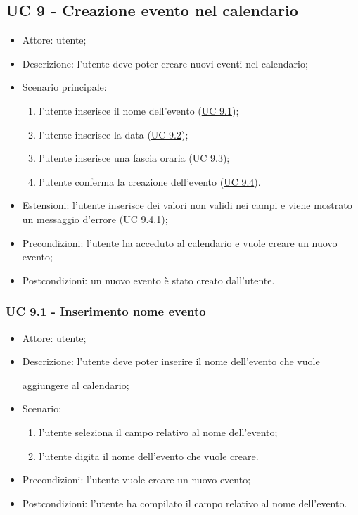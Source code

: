 

\subsection{UC 9 - Creazione evento nel calendario}
\begin{itemize}
    \item Attore: utente;
    \item Descrizione: l'utente deve poter creare nuovi eventi nel calendario;
    \item Scenario principale:
        \begin{enumerate}
        \item l'utente inserisce il nome dell'evento (\hyperref[sec: UC 9.1]{UC 9.1});
        \item l'utente inserisce la data (\hyperref[sec: UC 9.2]{UC 9.2});
        \item l'utente inserisce una fascia oraria (\hyperref[sec: UC 9.3]{UC 9.3});
        \item l'utente conferma la creazione dell'evento (\hyperref[sec: UC 9.4]{UC 9.4}).
        \end{enumerate}
    \item Estensioni: l'utente inserisce dei valori non validi nei campi e viene mostrato un messaggio d'errore (\hyperref[sec: UC 9.4.1]{UC 9.4.1});
    \item Precondizioni: l'utente ha acceduto al calendario e vuole creare un nuovo evento;
    \item Postcondizioni: un nuovo evento è stato creato dall'utente.
\end{itemize}

\subsubsection{UC 9.1 - Inserimento nome evento} \label{sec: UC 9.1}
\begin{itemize}
    \item Attore: utente;
    \item Descrizione: l'utente deve poter inserire il nome dell'evento che vuole \par aggiungere al calendario;
    \item Scenario:
        \begin{enumerate}
        \item l'utente seleziona il campo relativo al nome dell'evento;
        \item l'utente digita il nome dell'evento che vuole creare.
        \end{enumerate}
    
    \item Precondizioni: l'utente vuole creare un nuovo evento;
    \item Postcondizioni: l'utente ha compilato il campo relativo al nome dell'evento.
\end{itemize}


